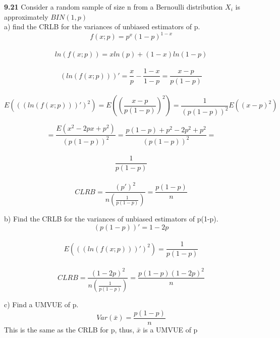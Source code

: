 
{\bf 9.21}
Consider a random sample of size n from a Bernoulli distribution $X_{i}$ is approximately $BIN(1,p)$
\\
a) find the CRLB for the variances of unbiased estimators of p.
\\ \[f(x;p)=p^{x}(1-p)^{1-x}\]
\\ \[ ln(f(x;p)) = xln(p)+(1-x)ln(1-p) \]
\\ \[ (ln(f(x;p)))' = \frac{x}{p} - \frac{1-x}{1-p} = \frac{x-p}{p(1-p)} \]
\\ \[ E(((ln(f(x;p)))')^{2}) = E((\frac{x-p}{p(1-p)})^{2}) = \frac{1}{(p(1-p))^{2}}E((x-p)^{2}) \]

\[	= \frac{E(x^{2}-2px+p^{2})}{(p(1-p))^{2}} = \frac{p(1-p) +p^{2}-2p^{2}+p^{2}}{(p(1-p))^{2}} = \]
\\\[ \frac{1}{p(1-p)} \]
\\ \[  CLRB = \frac{(p')^{2}}{n(\frac{1}{p(1-p)})} = \frac{p(1-p)}{n} \]

b) Find the CRLB for the variances of unbiased estimators of p(1-p).
\\ \[ (p(1-p))' = 1-2p \]
\\ \[ E(((ln(f(x;p)))')^{2}) = \frac{1}{p(1-p)} \]
\\ \[ CLRB = \frac{(1-2p)^{2}}{n(\frac{1}{p(1-p)})} = \frac{p(1-p)(1-2p)^{2}}{n} \]


c) Find a UMVUE of p.
\\ \[ Var(\bar{x}) = \frac{p(1-p)}{n} \]
This is the same as the CRLB for p, thus, $\bar{x}$ is a UMVUE of p \\

